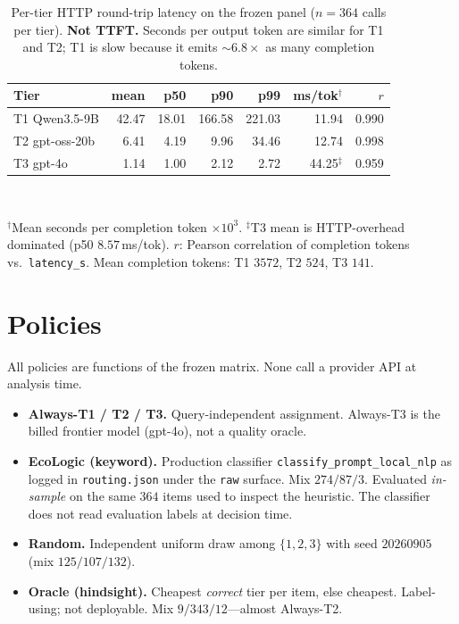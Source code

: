 \documentclass[10pt,conference]{IEEEtran}
\begin{document}
\begin{table}[t]
\centering
\caption{Per-tier HTTP round-trip latency on the frozen panel ($n{=}364$ calls per tier). \textbf{Not TTFT.} Seconds per output token are similar for T1 and T2; T1 is slow because it emits ${\sim}6.8\times$ as many completion tokens.}
\label{tab:tiers}
\setlength{\tabcolsep}{3.2pt}
\begin{tabular}{@{}lrrrrrr@{}}
\toprule
Tier & mean & p50 & p90 & p99 & ms/tok$^{\dagger}$ & $r$ \\
\midrule
T1 Qwen3.5-9B & 42.47 & 18.01 & 166.58 & 221.03 & 11.94 & 0.990 \\
T2 gpt-oss-20b & 6.41 & 4.19 & 9.96 & 34.46 & 12.74 & 0.998 \\
T3 gpt-4o & 1.14 & 1.00 & 2.12 & 2.72 & 44.25$^{\ddagger}$ & 0.959 \\
\bottomrule
\end{tabular}\\[2pt]
{\raggedright\footnotesize $^{\dagger}$Mean seconds per completion token $\times 10^{3}$. $^{\ddagger}$T3 mean is HTTP-overhead dominated (p50 $8.57$\,ms/tok). $r$: Pearson correlation of completion tokens vs.\ \texttt{latency\_s}. Mean completion tokens: T1 $3572$, T2 $524$, T3 $141$.\par}
\end{table}

\section{Policies}

All policies are functions of the frozen matrix. None call a provider API at analysis time.

\begin{itemize}
\item \textbf{Always-T1 / T2 / T3.} Query-independent assignment. Always-T3 is the billed frontier model (gpt-4o), not a quality oracle.
\item \textbf{EcoLogic (keyword).} Production classifier \texttt{classify\_prompt\_local\_nlp} as logged in \texttt{routing.json} under the \texttt{raw} surface. Mix $274/87/3$. Evaluated \emph{in-sample} on the same $364$ items used to inspect the heuristic. The classifier does not read evaluation labels at decision time.
\item \textbf{Random.} Independent uniform draw among $\{1,2,3\}$ with seed $20260905$ (mix $125/107/132$).
\item \textbf{Oracle (hindsight).} Cheapest \emph{correct} tier per item, else cheapest. Label-using; not deployable. Mix $9/343/12$---almost Always-T2.
\end{itemize}
\end{document}
